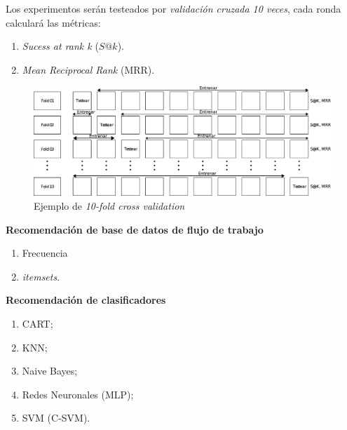 \begin{frame}
	\begin{block}{}
		Los experimentos serán testeados por \emph{validación cruzada 10 veces}, cada ronda calculará las métricas:
		\begin{enumerate}
			\item \emph{Sucess at rank k} (\(S@k\)).
			\item \emph{Mean Reciprocal Rank} (MRR).		
		\end{enumerate}
		
		\begin{figure}
			\begin{minipage}[b]{0.9\textwidth}
				\includegraphics[width=\textwidth]{./secoes/ConceitosFundamentais/10FOLDCROSS.eps}
				\caption{Ejemplo de \emph{10-fold cross validation}}
			\end{minipage}
		\end{figure}
		
	\end{block}
\end{frame}

\begin{frame}
	\begin{block}{}
		\textbf{Recomendación de base de datos de flujo de trabajo}
		\begin{enumerate}
			\item Frecuencia
			\item \emph{itemsets}.	
		\end{enumerate}
	\end{block}
\end{frame}


\begin{frame}
	\begin{block}{}
		\textbf{Recomendación de clasificadores}
		\begin{enumerate}
			\item CART;
			\item KNN;
			\item Naive Bayes;
			\item Redes Neuronales (MLP);
			\item SVM (C-SVM).		
		\end{enumerate}
	\end{block}
\end{frame}

